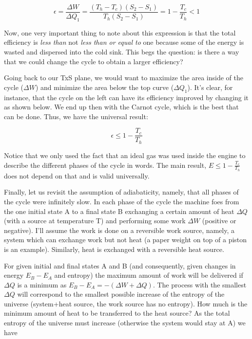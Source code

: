 \documentclass{article}
\begin{document}
$$\epsilon=\frac{\Delta W}{\Delta Q_{1}}=\frac{(T_{h}-T_{c})(S_{2}-S_{1})}{T_{h}(S_{2}-S_{1})}=1-\frac{T_{c}}{T_{h}}<1$$

Now, one very important thing to note about this expression is that the total efficiency is \textit{less than} not \textit{less than or equal to} one because some of the energy is wasted and dispersed into the cold sink.  This begs the question: is there a way that we could change the cycle to obtain a larger efficiency? 


Going back to our TxS plane, we would want to maximize the area inside of the cycle ($\Delta W$) and minimize the area below the top curve ($\Delta Q_{1}$).  It's clear, for instance, that the cycle on the left can have its efficiency improved by changing it as shown below.  We end up then with the Carnot cycle, which is the best that can be done.  Thus, we have the universal result:

$$\epsilon\leq1-\frac{T_{c}}{T_{h}}$$  

Notice that we only used the fact that an ideal gas was used inside the engine to describe the different phases of the cycle in words.  The main result, $E\leq1-\frac{T_{c}}{T_{h}}$ does not depend on that and is valid universally.  

Finally, let us revisit the assumption of adiabaticity, namely, that all phases of the cycle were infinitely slow.  In each phase of the cycle the machine foes from the one initial state A to a final state B exchanging a certain amount of heat $\Delta Q$ (with a source at temperature T) and performing some work $\Delta W$ (positive or negative).  I'll assume the work is done on a reversible work source, namely, a system which can exchange work but not heat (a paper weight on top of a piston is an example).  Similarly, heat is exchanged with a reversible heat source.


For given initial and final states A and B (and consequently, given changes in energy $E_{B}-E_{A}$ and entropy) the maximum amount of work will be delivered if $\Delta Q$ is a minimum as $E_{B}-E_{A}=-(\Delta W+\Delta Q)$.  The process with the smallest $\Delta Q$ will correspond to the smallest possible increase of the entropy of the universe (system+heat source, the work source has no entropy).  How much is the minimum amount of heat to be transferred to the heat source?  As the total entropy of the universe must increase (otherwise the system would stay at A) we have 
\end{document}

